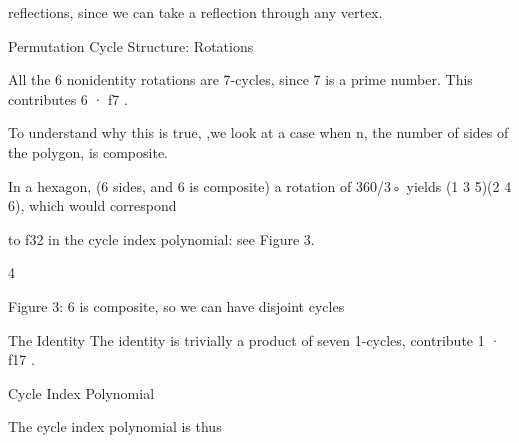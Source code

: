 \documentclass[a4paper,portrait,12pt]{article}
\begin{document}
\begin{flushleft}
reflections, since we can take a reflection through any vertex.
\end{flushleft}





\begin{flushleft}
Permutation Cycle Structure: Rotations
\end{flushleft}


\begin{flushleft}
All the 6 nonidentity rotations are 7-cycles, since 7 is a prime number. This contributes 6 · f7 .
\end{flushleft}


\begin{flushleft}
To understand why this is true, ,we look at a case when n, the number of sides of the polygon, is composite.
\end{flushleft}


\begin{flushleft}
In a hexagon, (6 sides, and 6 is composite) a rotation of 360/3◦ yields (1 3 5)(2 4 6), which would correspond
\end{flushleft}


\begin{flushleft}
to f32 in the cycle index polynomial: see Figure 3.
\end{flushleft}





4





\begin{flushleft}
\newpage
Figure 3: 6 is composite, so we can have disjoint cycles
\end{flushleft}





\begin{flushleft}
The Identity The identity is trivially a product of seven 1-cycles, contribute 1 · f17 .
\end{flushleft}


\begin{flushleft}
Cycle Index Polynomial
\end{flushleft}


\begin{flushleft}
The cycle index polynomial is thus
\end{flushleft}
\end{document}
